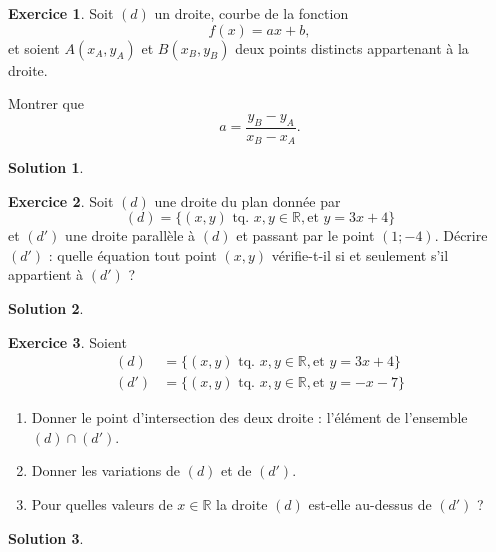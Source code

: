 \documentclass[12pt]{paper}
\theoremstyle{plain}
\newtheorem*{sol}{Solution}
\theoremstyle{definition}
\newtheorem{ex}{Exercice}
\newcommand{\R}{\mathbb{R}}
\newcommand{\exe}[2]{
		\begin{ex} #1  \end{ex}
		\begin{sol} #2 \end{sol}
	}
\newcommand{\exe}[2]{
		\begin{ex} #1  \end{ex}
	}
\begin{document}
\exe{
	Soit $(d)$ un droite, courbe de la fonction
		\[ f(x) = ax + b, \]
	et soient $A(x_A,y_A)$ et $B(x_B,y_B)$ deux points distincts appartenant à la droite.
	
	Montrer que 
		\[ a  = \dfrac{y_B - y_A}{x_B-x_A}. \]
}{}

\exe{
	Soit $(d)$ une droite du plan donnée par
		\[ (d) = \{ (x,y) \text{ tq. } x,y\in\R, \text{et }  y=3x+4 \} \] 
	et $(d')$ une droite parallèle à $(d)$ et passant par le point $(1;-4)$.
	Décrire $(d')$ : quelle équation tout point $(x,y)$ vérifie-t-il si et seulement s'il appartient à $(d')$ ?
}{}

\exe{
	Soient 
		\begin{align*}
		(d) &= \{ (x,y) \text{ tq. } x,y\in\R, \text{et }  y=3x+4 \} \\
		(d') &= \{ (x,y) \text{ tq. } x,y\in\R, \text{et }  y=-x-7 \}
		\end{align*}
	\begin{enumerate}
		\item Donner le point d'intersection des deux droite : l'élément de l'ensemble $(d) \cap (d')$.
		\item Donner les variations de $(d)$ et de $(d')$.
		\item Pour quelles valeurs de $x\in\R$ la droite $(d)$ est-elle au-dessus de $(d')$ ?	
	\end{enumerate}
}{}
\end{document}
